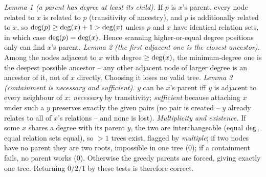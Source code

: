 \begin{proofbox}
\emph{Lemma 1 (a parent has degree at least its child).} If $p$ is $x$'s parent, every node related
to $x$ is related to $p$ (transitivity of ancestry), and $p$ is additionally related to $x$, so
$\operatorname{deg}(p)\ge\operatorname{deg}(x)+1>\operatorname{deg}(x)$ unless $p$ and $x$ have identical relation sets, in which case
$\operatorname{deg}(p)=\operatorname{deg}(x)$. Hence scanning higher-or-equal degree positions only can find $x$'s parent.
\emph{Lemma 2 (the first adjacent one is the closest ancestor).} Among the nodes adjacent to $x$
with degree $\ge\operatorname{deg}(x)$, the minimum-degree one is the deepest possible ancestor -- any other
adjacent node of larger degree is an ancestor of it, not of $x$ directly. Choosing it loses no
valid tree. \emph{Lemma 3 (containment is necessary and sufficient).} $y$ can be $x$'s parent iff
$y$ is adjacent to every neighbour of $x$: \emph{necessary} by transitivity; \emph{sufficient}
because attaching $x$ under such a $y$ preserves exactly the given pairs (no pair is created -- $y$
already relates to all of $x$'s relations -- and none is lost). \emph{Multiplicity and existence.}
If some $x$ shares a degree with its parent $y$, the two are interchangeable (equal $\operatorname{deg}$, equal relation
sets equal), so $>1$ trees exist, flagged by \emph{multiple}; if two nodes have no parent they are
two roots, impossible in one tree ($0$); if a containment fails, no parent works ($0$). Otherwise
the greedy parents are forced, giving exactly one tree. Returning $0/2/1$ by these tests is
therefore correct.
\end{proofbox}

